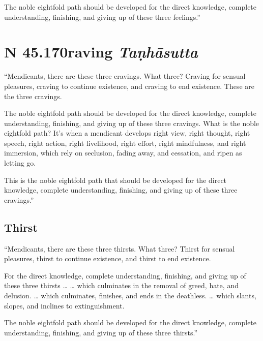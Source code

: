 \documentclass[12pt,openany]{book}%
\let\oldcontentsline\contentsline
\newcommand{\nopagecontentsline}[3]{\oldcontentsline{#1}{#2}{}}
\newcommand*{\suttatitleacronym}[1]{\smaller[2]{#1}\vspace*{.3em}}
\newcommand*{\suttatitletranslation}[1]{\linebreak{#1}}
\newcommand*{\suttatitleroot}[1]{\linebreak\smaller[2]\itshape{#1}}
\newcommand*{\tocacronym}[1]{\hspace*{-3.3em}{#1}\quad}
\newcommand*{\toctranslation}[1]{#1}
\newcommand*{\tocroot}[1]{(\textit{#1})}
\begin{document}
The noble eightfold path should be developed for the direct knowledge, complete understanding, finishing, and giving up of these three feelings.” 

%
\section*{{\suttatitleacronym SN 45.170}{\suttatitletranslation Craving }{\suttatitleroot Taṇhāsutta}}
\addcontentsline{toc}{section}{\tocacronym{SN 45.170} \toctranslation{Craving } \tocroot{Taṇhāsutta}}

“Mendicants, there are these three cravings. What three? Craving for sensual pleasures, craving to continue existence, and craving to end existence. These are the three cravings. 

The noble eightfold path should be developed for the direct knowledge, complete understanding, finishing, and giving up of these three cravings. What is the noble eightfold path? It’s when a mendicant develops right view, right thought, right speech, right action, right livelihood, right effort, right mindfulness, and right immersion, which rely on seclusion, fading away, and cessation, and ripen as letting go. 

This is the noble eightfold path that should be developed for the direct knowledge, complete understanding, finishing, and giving up of these three cravings.” 

\subsection*{Thirst }

“Mendicants, there are these three thirsts. What three? Thirst for sensual pleasures, thirst to continue existence, and thirst to end existence. 

For the direct knowledge, complete understanding, finishing, and giving up of these three thirsts … … which culminates in the removal of greed, hate, and delusion. … which culminates, finishes, and ends in the deathless. … which slants, slopes, and inclines to extinguishment. 

The noble eightfold path should be developed for the direct knowledge, complete understanding, finishing, and giving up of these three thirsts.” 

%
\end{document}
